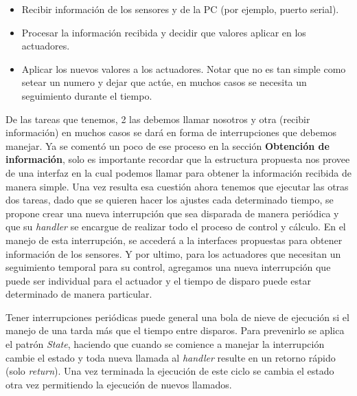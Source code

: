 \begin{itemize}
    \item Recibir información de los sensores y de la PC (por ejemplo, puerto serial).
    \item Procesar la información recibida y decidir que valores aplicar en los actuadores.
    \item Aplicar los nuevos valores a los actuadores. Notar que no es tan simple como setear un numero y dejar que actúe, en muchos casos se necesita un seguimiento durante el tiempo.
\end{itemize}

De las tareas que tenemos, 2 las debemos llamar nosotros y otra (recibir información) en muchos casos se dará en forma de interrupciones que debemos manejar. Ya se comentó un poco de ese proceso en la sección \textbf{Obtención de información}, solo es importante recordar que la estructura propuesta nos provee de una interfaz en la cual podemos llamar para obtener la información recibida de manera simple. Una vez resulta esa cuestión ahora tenemos que ejecutar las otras dos tareas, dado que se quieren hacer los ajustes cada determinado tiempo, se propone crear una nueva interrupción que sea disparada de manera periódica y que su \textit{handler} se encargue de realizar todo el proceso de control y cálculo. En el manejo de esta interrupción, se accederá a la interfaces propuestas para obtener información de los sensores. Y por ultimo, para los actuadores que necesitan un seguimiento temporal para su control, agregamos una nueva interrupción que puede ser individual para el actuador y el tiempo de disparo puede estar determinado de manera particular.

Tener interrupciones periódicas puede general una bola de nieve de ejecución si el manejo de una tarda más que el tiempo entre disparos. Para prevenirlo se aplica el patrón \textit{State}, haciendo que cuando se comience a manejar la interrupción cambie el estado y toda nueva llamada al \textit{handler} resulte en un retorno rápido (solo \textit{return}). Una vez terminada la ejecución de este ciclo se cambia el estado otra vez permitiendo la ejecución de nuevos llamados.

